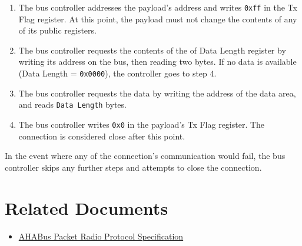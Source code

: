 \begin{appendices}
\begin{enumerate}
\def\labelenumi{\arabic{enumi}.}
\item
  The bus controller addresses the payload's address and writes
  \texttt{0xff} in the Tx Flag register. At this point, the payload must
  not change the contents of any of its public registers.
\item
  The bus controller requests the contents of the of Data Length
  register by writing its address on the bus, then reading two bytes. If
  no data is available (Data Length = \texttt{0x0000}), the controller
  goes to step 4.
\item
  The bus controller requests the data by writing the address of the
  data area, and reads \texttt{Data\ Length} bytes.
\item
  The bus controller writes \texttt{0x0} in the payload's Tx Flag
  register. The connection is considered close after this point.
\end{enumerate}

In the event where any of the connection's communication would fail, the
bus controller skips any further steps and attempts to close the
connection.

\section{Related Documents}\label{related-documents}

\begin{itemize}
\item
  \href{https://github.com/AHABus/src/software/packet-radio.md}{AHABus
  Packet Radio Protocol Specification}
\end{itemize}


\end{appendices}